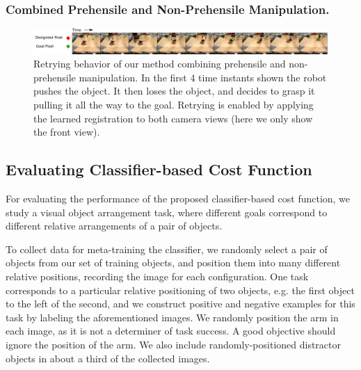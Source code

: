 \subsubsection{Combined Prehensile and Non-Prehensile Manipulation.}
\begin{figure}
	\centering
	\includegraphics[width=1.0\textwidth]{images_rfr/pick_place_plush.pdf}
	\caption{\small{Retrying behavior of our method combining prehensile and non-prehensile manipulation. In the first 4 time instants shown the robot pushes the object. It then loses the object, and decides to grasp it pulling it all the way to the goal. Retrying is enabled by applying the learned registration to both camera views (here we only show the front view).}}
	\label{fig:push_grasp}
	
\end{figure}


\subsection{Evaluating Classifier-based Cost Function}

For evaluating the performance of the proposed classifier-based cost function, we study a visual object arrangement task, where different goals correspond to different relative arrangements of a pair of objects. 

To collect data for meta-training the classifier, we randomly select a pair of objects from our set of training objects, and position them into many different relative positions, recording the image for each configuration. One task corresponds to a particular relative positioning of two objects, e.g. the first object to the left of the second, and we construct positive and negative examples for this task by labeling the aforementioned images. We randomly position the arm in each image, as it is not a determiner of task success. A good objective should ignore the position of the arm. We also include randomly-positioned distractor objects in about a third of the collected images.

